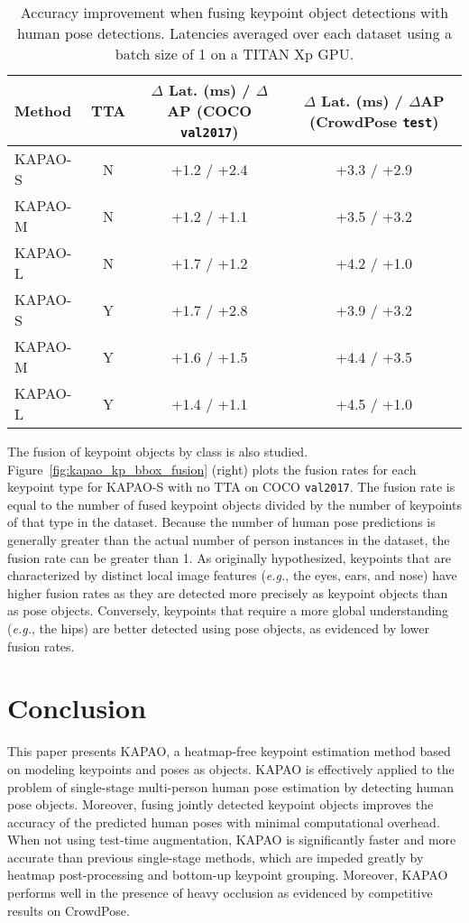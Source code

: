 \documentclass[runningheads]{llncs}
\newcommand{\eg}{\textit{e.g.}}
\begin{document}
\begin{table}[t]
\footnotesize
\centering
\begin{tabular}{l|c|c|c}
	\hline
	Method & TTA & \makecell{$\Delta$ Lat. (ms) / $\Delta$AP\\(COCO \texttt{val2017})} & \makecell{$\Delta$ Lat. (ms) / $\Delta$AP\\(CrowdPose \texttt{test})}\\
	\hline
	KAPAO-S & N & +1.2 / +2.4 & +3.3 / +2.9 \\
	KAPAO-M & N & +1.2 / +1.1 & +3.5 / +3.2\\
	KAPAO-L & N & +1.7 / +1.2 & +4.2 / +1.0 \\
    \hline
	KAPAO-S & Y & +1.7 / +2.8 & +3.9 / +3.2 \\
	KAPAO-M & Y & +1.6 / +1.5 & +4.4 / +3.5 \\
	KAPAO-L & Y & +1.4 / +1.1 & +4.5 / +1.0 \\
	\hline
\end{tabular}
\smallskip
\caption[Accuracy improvement resulting from fusing keypoint objects with pose objects.]{Accuracy improvement when fusing keypoint object detections with human pose detections. Latencies averaged over each dataset using a batch size of 1 on a TITAN Xp GPU.}
\label{tab:kapao_det_fusion}
\end{table}

The fusion of keypoint objects by class is also studied. Figure~\ref{fig:kapao_kp_bbox_fusion} (right) plots the fusion rates for each keypoint type for KAPAO-S with no TTA on COCO \texttt{val2017}. The fusion rate is equal to the number of fused keypoint objects divided by the number of keypoints of that type in the dataset. Because the number of human pose predictions is generally greater than the actual number of person instances in the dataset, the fusion rate can be greater than 1. As originally hypothesized, keypoints that are characterized by distinct local image features (\eg, the eyes, ears, and nose) have higher fusion rates as they are detected more precisely as keypoint objects than as pose objects. Conversely, keypoints that require a more global understanding (\eg, the hips) are better detected using pose objects, as evidenced by lower fusion rates.

\section{Conclusion}
This paper presents KAPAO, a heatmap-free keypoint estimation method based on modeling keypoints and poses as objects. KAPAO is effectively applied to the problem of single-stage multi-person human pose estimation by detecting human pose objects. Moreover, fusing jointly detected keypoint objects improves the accuracy of the predicted human poses with minimal computational overhead. When not using test-time augmentation, KAPAO is significantly faster and more accurate than previous single-stage methods, which are impeded greatly by heatmap post-processing and bottom-up keypoint grouping. Moreover, KAPAO performs well in the presence of heavy occlusion as evidenced by competitive results on CrowdPose.
\end{document}
